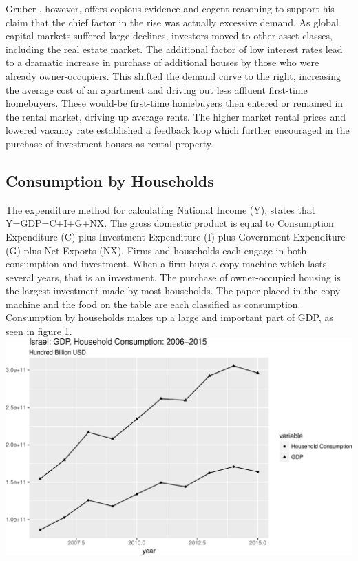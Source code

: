 \documentclass[12pt,a4paper,]{article}
\begin{document}
Gruber \autocite{gruberSep2016}, however, offers copious evidence and
cogent reasoning to support his claim that the chief factor in the rise
was actually excessive demand. As global capital markets suffered large
declines, investors moved to other asset classes, including the real
estate market. The additional factor of low interest rates lead to a
dramatic increase in purchase of additional houses by those who were
already owner-occupiers. This shifted the demand curve to the right,
increasing the average cost of an apartment and driving out less
affluent first-time homebuyers. These would-be first-time homebuyers
then entered or remained in the rental market, driving up average rents.
The higher market rental prices and lowered vacancy rate established a
feedback loop which further encouraged in the purchase of investment
houses as rental property.

\subsection{Consumption by Households}\label{consumption-by-households}

The expenditure method for calculating National Income (Y), states that
Y=GDP=C+I+G+NX. The gross domestic product is equal to Consumption
Expenditure (C) plus Investment Expenditure (I) plus Government
Expenditure (G) plus Net Exports (NX). Firms and households each engage
in both consumption and investment. When a firm buys a copy machine
which lasts several years, that is an investment. The purchase of
owner-occupied housing is the largest investment made by most
households. The paper placed in the copy machine and the food on the
table are each classified as consumption. Consumption by households
makes up a large and important part of GDP, as seen in figure 1.
\includegraphics{currentWorkingDraft_files/figure-latex/unnamed-chunk-1-1.pdf}
\end{document}
